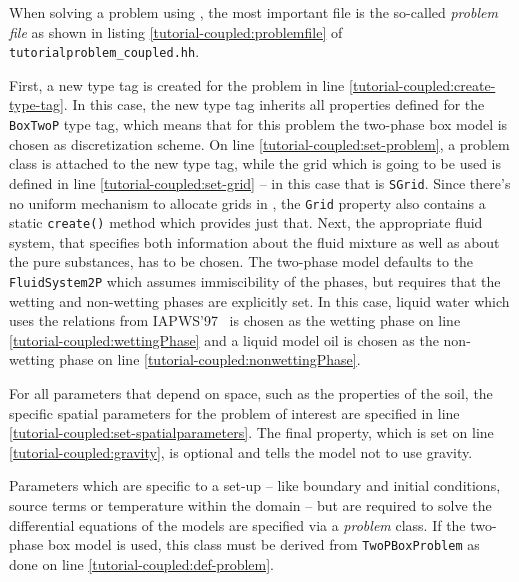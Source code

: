 When solving a problem using \Dumux, the most important file is the
so-called \textit{problem file} as shown in listing
\ref{tutorial-coupled:problemfile} of
\texttt{tutorialproblem\_coupled.hh}.

\begin{lst}\label{tutorial-coupled:problemfile} \mbox{}

\end{lst}

First, a new type tag is created for the problem in line
\ref{tutorial-coupled:create-type-tag}.  In this case, the new type
tag inherits all properties defined for the \texttt{BoxTwoP} type tag,
which means that for this problem the two-phase box model is chosen as
discretization scheme. On line \ref{tutorial-coupled:set-problem}, a
problem class is attached to the new type tag, while the grid which
is going to be used is defined in line \ref{tutorial-coupled:set-grid} --
in this case that is  \texttt{SGrid}.  Since there's no uniform
mechanism to allocate grids in \Dune, the \texttt{Grid} property also contains
a static \texttt{create()} method which provides just that. Next,
the appropriate fluid system, that specifies both information about
the fluid mixture as well as about the pure substances, has to be chosen. 
The two-phase model defaults to the \texttt{FluidSystem2P} which assumes 
immiscibility of the phases, but requires that the wetting and non-wetting phases
are explicitly set. In this case, liquid water which uses the relations from 
IAPWS'97~\cite{IAPWS1997} is chosen as the wetting phase on line
\ref{tutorial-coupled:wettingPhase} and a liquid model oil is chosen as the 
non-wetting phase on line \ref{tutorial-coupled:nonwettingPhase}. 

For all parameters that depend on space, such as the properties of the
 soil, the specific spatial 
parameters for the problem of interest are specified in line
\ref{tutorial-coupled:set-spatialparameters}. The final property, which is set on line
\ref{tutorial-coupled:gravity}, is optional and tells the model not to
use gravity.

Parameters which are specific to a set-up -- like boundary and initial
conditions, source terms or temperature within the domain -- but are
required to solve the differential equations of the models are
specified via a \textit{problem} class. If the two-phase box model is
used, this class must be derived from \texttt{TwoPBoxProblem} as done
on line \ref{tutorial-coupled:def-problem}.

